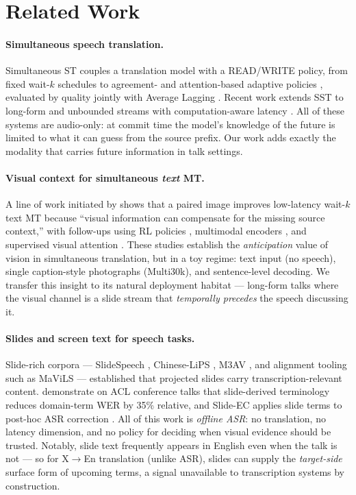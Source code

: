 \section{Related Work}
\label{sec:related}

\paragraph{Simultaneous speech translation.}
Simultaneous ST couples a translation model with a READ/WRITE policy, from fixed
wait-$k$ schedules \citep{ma2019stacl} to agreement- and attention-based adaptive
policies \citep{liu2020lowlatency,papi2023alignatt}, evaluated by quality jointly
with Average Lagging \citep{ma2019stacl,ma2020simuleval}. Recent work extends SST
to long-form and unbounded streams with computation-aware latency
\citep{ouyang2025infinisst,papi2026doa}. All of these systems are audio-only: at
commit time the model's knowledge of the future is limited to what it can guess
from the source prefix. Our work adds exactly the modality that carries future
information in talk settings.

\paragraph{Visual context for simultaneous \emph{text} MT.}
A line of work initiated by \citet{caglayan2020simultaneous} shows that a paired
image improves low-latency wait-$k$ text MT because ``visual information can
compensate for the missing source context,'' with follow-ups using RL policies
\citep{ive2021exploiting}, multimodal encoders \citep{imankulova2020multimodal},
and supervised visual attention \citep{haralampieva2022supervised}. These studies
establish the \emph{anticipation} value of vision in simultaneous translation, but
in a toy regime: text input (no speech), single caption-style photographs
(Multi30k), and sentence-level decoding. We transfer this insight to its natural
deployment habitat --- long-form talks where the visual channel is a slide stream
that \emph{temporally precedes} the speech discussing it.

\paragraph{Slides and screen text for speech tasks.}
Slide-rich corpora --- SlideSpeech \citep{wang2023slidespeech}, Chinese-LiPS
\citep{zhao2025chineselips}, M3AV \citep{chen2024m3av}, and alignment tooling such
as MaViLS \citep{anderer2024mavils} --- established that projected slides carry
transcription-relevant content. \citet{sinhamahapatra2025slides} demonstrate on
ACL conference talks that slide-derived terminology reduces domain-term WER by
35\% relative, and Slide-EC applies slide terms to post-hoc ASR correction
\citep{piao2025slideec}. All of this work is \emph{offline ASR}: no translation,
no latency dimension, and no policy for deciding when visual evidence should be
trusted. Notably, slide text frequently appears in English even when the talk is
not --- so for X$\rightarrow$En translation (unlike ASR), slides can supply the
\emph{target-side} surface form of upcoming terms, a signal unavailable to
transcription systems by construction.


